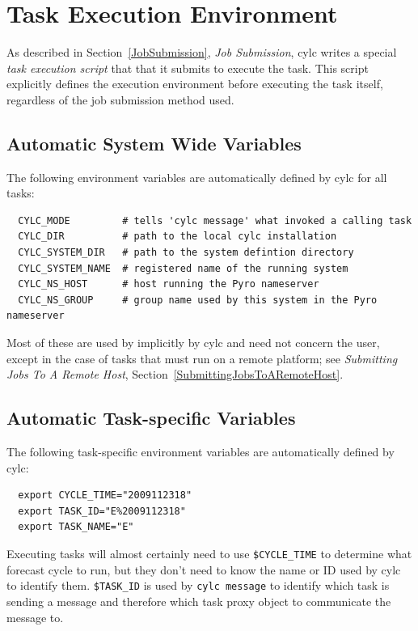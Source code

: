 \documentclass[11pt,a4paper]{article}
\begin{document}
\pagebreak
\section{Task Execution Environment}
\label{TaskExecutionEnvironment}

As described in Section~\ref{JobSubmission}, {\em Job Submission}, cylc
writes a special {\em task execution script} that that it submits to 
execute the task.  This script explicitly defines the execution
environment before executing the task itself, regardless of the job 
submission method used. 

\subsection{Automatic System Wide Variables}
\lstset{language=bash}

The following environment variables are automatically defined by cylc
for all tasks:


\begin{lstlisting}
  CYLC_MODE         # tells 'cylc message' what invoked a calling task
  CYLC_DIR          # path to the local cylc installation
  CYLC_SYSTEM_DIR   # path to the system defintion directory
  CYLC_SYSTEM_NAME  # registered name of the running system 
  CYLC_NS_HOST      # host running the Pyro nameserver
  CYLC_NS_GROUP     # group name used by this system in the Pyro nameserver
\end{lstlisting}

Most of these are used by implicitly by cylc and need not concern the user,
except in the case of tasks that must run on a remote platform; see 
{\em Submitting Jobs To A Remote Host}, 
Section~\ref{SubmittingJobsToARemoteHost}.

\subsection{Automatic Task-specific Variables}
\lstset{language=bash}

The following task-specific environment variables are automatically
defined by cylc:

\begin{lstlisting}
  export CYCLE_TIME="2009112318"
  export TASK_ID="E%2009112318"
  export TASK_NAME="E"
\end{lstlisting}

Executing tasks will almost certainly need to use
\lstinline=$CYCLE_TIME= to determine what forecast cycle to run,
but they don't need to know the name or ID used by cylc to identify
them. \lstinline=$TASK_ID= is used by \lstinline=cylc message= to 
identify which task is sending a message and therefore which task proxy
object to communicate the message to.
\end{document}
